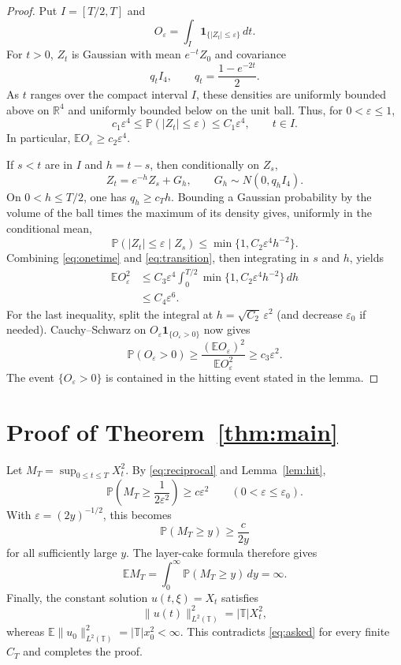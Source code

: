 \documentclass[10pt]{article}
\newcommand{\E}{\mathbb E}
\newcommand{\Pp}{\mathbb P}
\newcommand{\Torus}{\mathbb T}
\newcommand{\R}{\mathbb R}
\newcommand{\1}{\mathbf 1}
\begin{document}
\begin{proof}
Put $I=[T/2,T]$ and
\[
 O_\varepsilon=\int_I\1_{\{|Z_t|\le\varepsilon\}}\,dt.
\]
For $t>0$, $Z_t$ is Gaussian with mean $e^{-t}Z_0$ and covariance
\[
 q_t I_4,\qquad q_t=\frac{1-e^{-2t}}2.
\]
As $t$ ranges over the compact interval $I$, these densities are uniformly
bounded above on $\R^4$ and uniformly bounded below on the unit ball.  Thus,
for $0<\varepsilon\le1$,
\begin{equation}\label{eq:onetime}
 c_1\varepsilon^4\le \Pp(|Z_t|\le\varepsilon)
 \le C_1\varepsilon^4,
 \qquad t\in I.
\end{equation}
In particular, $\E O_\varepsilon\ge c_2\varepsilon^4$.

If $s<t$ are in $I$ and $h=t-s$, then conditionally on $Z_s$,
\[
 Z_t=e^{-h}Z_s+G_h,
 \qquad G_h\sim N(0,q_h I_4).
\]
On $0<h\le T/2$, one has $q_h\ge c_T h$.  Bounding a Gaussian probability
by the volume of the ball times the maximum of its density gives, uniformly
in the conditional mean,
\begin{equation}\label{eq:transition}
 \Pp(|Z_t|\le\varepsilon\mid Z_s)
 \le \min\{1,C_2\varepsilon^4 h^{-2}\}.
\end{equation}
Combining \eqref{eq:onetime} and \eqref{eq:transition}, then integrating in
$s$ and $h$, yields
\begin{align*}
 \E O_\varepsilon^2
 &\le C_3\varepsilon^4
   \int_0^{T/2}\min\{1,C_2\varepsilon^4h^{-2}\}\,dh \\
 &\le C_4\varepsilon^6.
\end{align*}
For the last inequality, split the integral at
$h=\sqrt{C_2}\,\varepsilon^2$ (and decrease $\varepsilon_0$ if needed).
Cauchy--Schwarz on $O_\varepsilon\1_{\{O_\varepsilon>0\}}$ now gives
\[
 \Pp(O_\varepsilon>0)
 \ge \frac{(\E O_\varepsilon)^2}{\E O_\varepsilon^2}
 \ge c_3\varepsilon^2.
\]
The event $\{O_\varepsilon>0\}$ is contained in the hitting event stated in
the lemma.
\end{proof}

\section{Proof of Theorem~\ref{thm:main}}

Let $M_T=\sup_{0\le t\le T}X_t^2$.  By \eqref{eq:reciprocal} and
Lemma~\ref{lem:hit},
\[
 \Pp\!\left(M_T\ge\frac{1}{2\varepsilon^2}\right)
 \ge c\varepsilon^2
 \qquad(0<\varepsilon\le\varepsilon_0).
\]
With $\varepsilon=(2y)^{-1/2}$, this becomes
\[
 \Pp(M_T\ge y)\ge \frac{c}{2y}
\]
for all sufficiently large $y$.  The layer-cake formula therefore gives
\[
 \E M_T=\int_0^\infty\Pp(M_T\ge y)\,dy=\infty.
\]
Finally, the constant solution $u(t,\xi)=X_t$ satisfies
\[
 \|u(t)\|_{L^2(\Torus)}^2=|\Torus|X_t^2,
\]
whereas $\E\|u_0\|_{L^2(\Torus)}^2=|\Torus|x_0^2<\infty$.  This contradicts
\eqref{eq:asked} for every finite $C_T$ and completes the proof.
\end{document}
